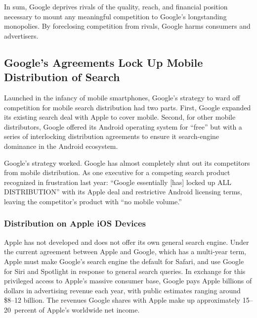 \documentclass[11pt,b5paper,headings=small]{scrartcl}
\begin{document}

In sum, Google deprives rivals of the quality, reach, and financial position
necessary to mount any meaningful competition to Google’s longstanding monopolies. By
foreclosing competition from rivals, Google harms consumers and advertisers.

\subsection{Google's Agreements Lock Up Mobile Distribution of Search}


Launched in the infancy of mobile smartphones, Google’s strategy to ward off
competition for mobile search distribution had two parts. First, Google expanded its existing
search deal with Apple to cover mobile. Second, for other mobile distributors, Google offered its
Android operating system for “free” but with a series of interlocking distribution agreements to
ensure it search-engine dominance in the Android ecosystem.


Google’s strategy worked. Google has almost completely shut out its competitors
from mobile distribution. As one executive for a competing search product recognized in
frustration last year: “Google essentially [has] locked up ALL DISTRIBUTION” with its Apple
deal and restrictive Android licensing terms, leaving the competitor’s product with “no mobile
volume.”




\subsubsection{Distribution on Apple iOS Devices}
Apple has not developed and does not offer its own general search engine. Under
the current agreement between Apple and Google, which has a multi-year term, Apple must
make Google’s search engine the default for Safari, and use Google for Siri and Spotlight in
response to general search queries. In exchange for this privileged access to Apple’s massive
consumer base, Google pays Apple billions of dollars in advertising revenue each year, with
public estimates ranging around \$8–12 billion. The revenues Google shares with Apple make up
approximately 15–20~percent of Apple’s worldwide net income.

\end{document}
